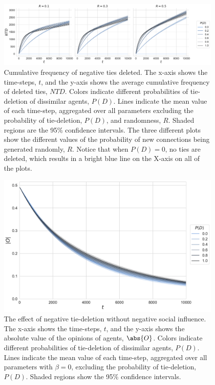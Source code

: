 \documentclass[11pt]{article}
\DeclarePairedDelimiter{\abs}\lvert\rvert
\begin{document}
\begin{figure}[H]
    \centering
    \includegraphics[width=.99\linewidth]{../plots/overall/Negative_Tie_Deleted.pdf}
  \caption{Cumulative frequency of negative ties deleted. The x-axis shows the time-steps, $t$, and the y-axis shows the average cumulative frequency of deleted ties, $NTD$. Colors indicate different probabilities of tie-deletion of dissimilar agents, $P(D)$. Lines indicate the mean value of each time-step, aggregated over all parameters excluding the probability of tie-deletion, $P(D)$, and randomness, $R$. Shaded regions are the 95\% confidence intervals. The three different plots show the different values of the probability of new connections being generated randomly, $R$. Notice that when $P(D) = 0$, no ties are deleted, which results in a bright blue line on the X-axis on all of the plots.}
  \label{fig:ntd}
\end{figure}

\begin{figure}[H]
    \centering
    \includegraphics[width=.99\linewidth]{../plots/overall/Absolute_Opinion_Tie_Deletion_Without_Negative.pdf}
  \caption{The effect of negative tie-deletion without negative social influence. The x-axis shows the time-steps, $t$, and the y-axis shows the absolute value of the opinions of agents, $\abs{O}$. Colors indicate different probabilities of tie-deletion of dissimilar agents, $P(D)$. Lines indicate the mean value of each time-step, aggregated over all parameters with $\beta = 0$, excluding the probability of tie-deletion, $P(D)$. Shaded regions show the 95\% confidence intervals.}
  \label{fig:pd_no_negative}
\end{figure}
\end{document}
